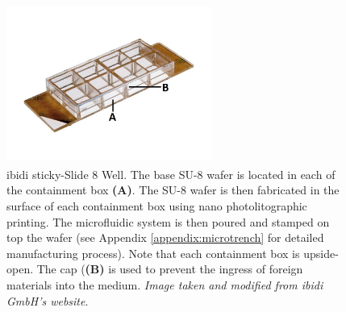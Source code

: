 \documentclass[pdftex,12pt,a4paper]{report}
\begin{document}
\begin{figure}[H]
\centering
\includegraphics[width=0.6\textwidth]{images/sticky-slide-8-well-marked}
\caption{ibidi\textsuperscript{\textregistered} sticky-Slide 8 Well. The base SU-8 wafer is located in each of the containment box \textbf{(A)}. The SU-8 wafer is then fabricated in the surface of each containment box using nano photolitographic printing. The microfluidic system is then poured and stamped on top the wafer (see Appendix \ref{appendix:microtrench} for detailed manufacturing process). Note that each containment box is upside-open. The cap (\textbf{(B)} is used to prevent the ingress of foreign materials into the medium. \textit{Image taken and modified from ibidi GmbH's website}.}
\label{fig:ibidi}
\end{figure}
\end{document}
